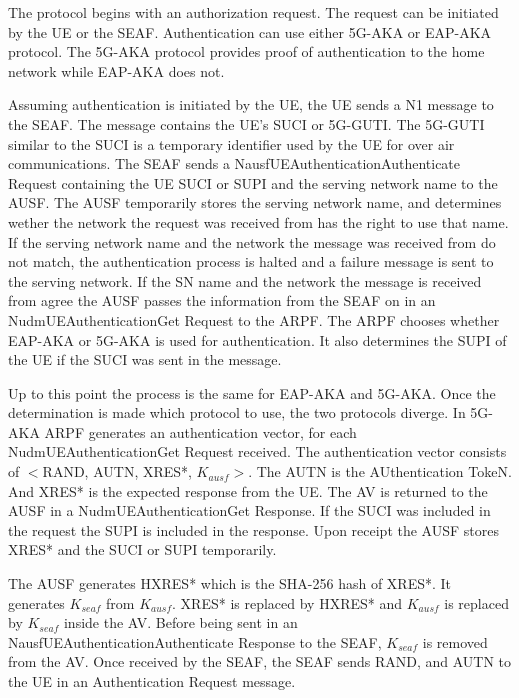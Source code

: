 \documentclass[11pt, pdftex]{article}
\begin{document}
The protocol begins with an authorization request.  The request can be initiated by the UE or the SEAF.  Authentication can use either 5G-AKA or EAP-AKA protocol.  The 5G-AKA protocol provides proof of authentication to the home network while EAP-AKA does not.  

Assuming authentication is initiated by the UE, the UE sends a N1 message to the SEAF.  The message contains the UE's SUCI or 5G-GUTI.  The 5G-GUTI similar to the SUCI is a temporary identifier used by the UE for over air communications.  The SEAF sends a Nausf\textunderscore UEAuthentication\textunderscore Authenticate Request containing the UE SUCI or SUPI and the serving network name to the AUSF.  The AUSF temporarily stores the serving network name, and determines wether the network the request was received from has the right to use that name.  If the serving network name and the network the message was received from do not match, the authentication process is halted and a failure message is sent to the serving network.  If the SN name and the network the message is received from agree the AUSF passes the information from the SEAF on in an Nudm\textunderscore UEAuthentication\textunderscore Get Request to the ARPF.  The ARPF chooses whether EAP-AKA or 5G-AKA is used for authentication.  It also determines the SUPI of the UE if the SUCI was sent in the message.  

Up to this point the process is the same for EAP-AKA and 5G-AKA.  Once the determination is made which protocol to use, the two protocols diverge.  In 5G-AKA ARPF generates an authentication vector, for each Nudm\textunderscore UEAuthentication\textunderscore Get Request received.  The authentication vector consists of $<$RAND, AUTN, XRES*, $K_{ausf}$$>$.  The AUTN is the AUthentication TokeN.  And XRES* is the expected response from the UE.  The AV is returned to the AUSF in a Nudm\textunderscore UEAuthentication\textunderscore Get Response.  If the SUCI was included in the request the SUPI is included in the response.  Upon receipt the AUSF stores XRES* and the SUCI or SUPI temporarily.  

The AUSF generates HXRES* which is the SHA-256 hash of XRES*.  It generates $K_{seaf}$ from $K_{ausf}$.  XRES* is replaced by HXRES* and $K_{ausf}$ is replaced by $K_{seaf}$ inside the AV.  Before being sent in an Nausf\textunderscore UEAuthentication\textunderscore Authenticate Response to the SEAF, $K_{seaf}$ is removed from the AV.  Once received by the SEAF, the SEAF sends RAND, and AUTN to the UE in an Authentication Request message.  
\end{document}
